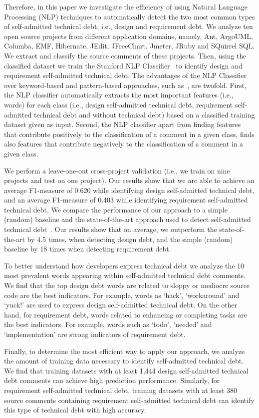 \documentclass[10pt,journal,compsoc]{IEEEtran}
\newcommand{\SATD}{self-admitted technical debt\xspace}
\begin{document}
Therefore, in this paper we investigate the efficiency of using Natural Language Processing (NLP) techniques to automatically detect the two most common types of \SATD, i.e., design and requirement debt. We analyze ten open source projects from different application domains, namely, Ant, ArgoUML, Columba, EMF, Hibernate, JEdit, JFreeChart, Jmeter, JRuby and SQuirrel SQL. We extract and classify the source comments of these projects. Then, using the classified dataset we train the Stanford NLP Classifier~\cite{Manning2014ACL} to identify design and requirement \SATD.
The advantages of the NLP Classifier over keyword-based and pattern-based approaches, such as~\cite{Potdar2014ICSME}, are twofold. First, the NLP classifier automatically extracts the most important features (i.e., words) for each class (i.e., design \SATD, requirement \SATD and without technical debt) based on a classified training dataset given as input. Second, the NLP classifier apart from finding features that contribute positively to the classification of a comment in a given class, finds also features that contribute negatively to the classification of a comment in a given class.

We perform a leave-one-out cross-project validation (i.e., we train on nine projects and test on one project). Our results show that we are able to  achieve an average F1-measure of 0.620 while identifying design \SATD, and an average F1-measure of 0.403 while identifying requirement \SATD. We compare the performance of our approach to a simple (random) baseline and the state-of-the-art approach used to detect \SATD~\cite{Potdar2014ICSME}. Our results show that on average, we outperform the state-of-the-art by 4.5 times, when detecting design debt, and the simple (random) baseline by 18 times when detecting requirement debt.

To better understand how developers express technical debt we analyze the 10 most prevalent words appearing within \SATD comments. 
We find that the top design debt words are related to sloppy or mediocre source code are the best indicators. For example, words as `hack', `workaround' and `yuck!' are used to express design \SATD. On the other hand, for requirement debt, words related to enhancing or completing tasks are the best indicators. For example, words such as `todo', `needed' and `implementation' are strong indicators of requirement debt. 

Finally, to determine the most efficient way to apply our approach, we analyze the amount of training data necessary to identify \SATD. We find that training datasets with at least 1,444 design \SATD comments can achieve high prediction performance. Similarly, for requirement \SATD, training datasets with at least 380 source comments containing requirement \SATD can identify this type of technical debt with high accuracy.  
\end{document}
